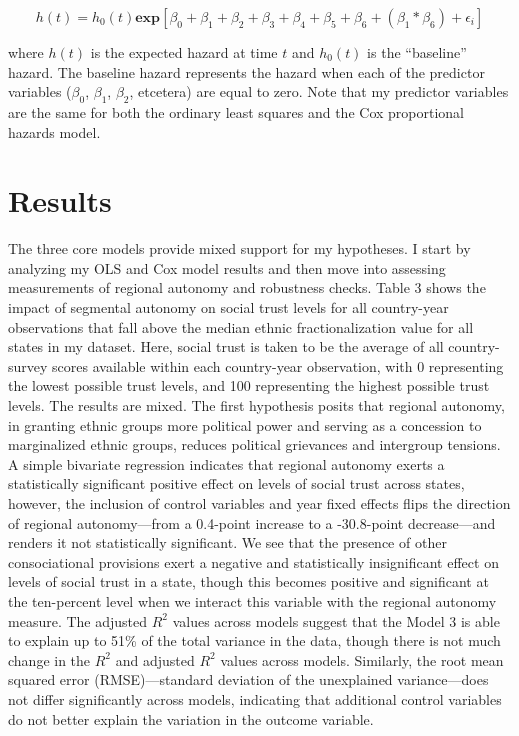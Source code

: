 \documentclass[12pt]{article}
\begin{document}
\begin{equation}
h(t) = h_0 (t)\textbf{exp}[\beta_0 + \beta_1 + \beta_2 + \beta_3 + \beta_4 + \beta_5 + \beta_6 + (\beta_1 * \beta_6) + \epsilon_i]
\end{equation}

where $h(t)$ is the expected hazard at time $t$ and $h_0 (t)$ is the ``baseline'' hazard. The baseline hazard represents the hazard when each of the predictor variables ($\beta_0$, $\beta_1$, $\beta_2$, etcetera) are equal to zero. Note that my predictor variables are the same for both the ordinary least squares and the Cox proportional hazards model. 

\section{Results}
The three core models provide mixed support for my hypotheses. I start by analyzing my OLS and Cox model results and then move into assessing measurements of regional autonomy and robustness checks. Table 3 shows the impact of segmental autonomy on social trust levels for all country-year observations that fall above the median ethnic fractionalization value for all states in my dataset. Here, social trust is taken to be the average of all country-survey scores available within each country-year observation, with 0 representing the lowest possible trust levels, and 100 representing the highest possible trust levels. The results are mixed. The first hypothesis posits that regional autonomy, in granting ethnic groups more political power and serving as a concession to marginalized ethnic groups, reduces political grievances and intergroup tensions. A simple bivariate regression indicates that regional autonomy exerts a statistically significant positive effect on levels of social trust across states, however, the inclusion of control variables and year fixed effects flips the direction of regional autonomy---from a 0.4-point increase to a -30.8-point decrease---and renders it not statistically significant. We see that the presence of other consociational provisions exert a negative and statistically insignificant effect on levels of social trust in a state, though this becomes positive and significant at the ten-percent level when we interact this variable with the regional autonomy measure. The adjusted $R^2$ values across models suggest that the Model 3 is able to explain up to 51\% of the total variance in the data, though there is not much change in the $R^2$ and adjusted $R^2$ values across models. Similarly, the root mean squared error (RMSE)---standard deviation of the unexplained variance---does not differ significantly across models, indicating that additional control variables do not better explain the variation in the outcome variable.  
\end{document}
